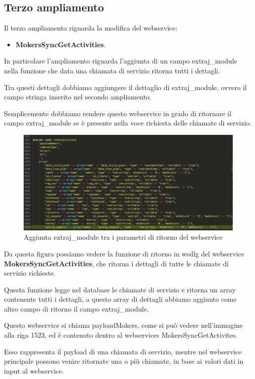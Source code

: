 \subsection{Terzo ampliamento}
Il terzo ampliamento riguarda la modifica del webservice:
\begin{itemize}
	\item \textbf{MokersSyncGetActivities}.
\end{itemize}
\begin{flushleft}
	
	In particolare l'ampliamento riguarda l'aggiunta di un campo extraj\_module nella funzione che data una chiamata di servizio ritorna tutti i dettagli.
	
	Tra questi dettagli dobbiamo aggiungere il dettaglio di extraj\_module, ovvero il campo stringa inserito nel secondo ampliamento.
	
	Semplicemente dobbiamo rendere questo webservice in grado di ritornare il campo extraj\_module se è presente nella voce richiesta delle chiamate di servizio.
	
\end{flushleft}
\newspace
\begin{figure}[!h] 
	\centering
	\includegraphics[scale = 0.3]{immagini/webservices/ampliamenti/3ampl__types_getCisa.png}
	\caption{Aggiunta extraj\_module tra i parametri di ritorno del webservice}
\end{figure}
\newspace
\begin{flushleft}
	Da questa figura possiamo vedere la funzione di ritorno in \gls{wsdlg} del webservice \textbf{MokersSyncGetActivities}, che ritorna i dettagli di tutte le chiamate di servizio richieste. 
	\newspace
	
	Questa funzione legge nel database le chiamate di servizio e ritorna un array contenente tutti i dettagli, a questo array di dettagli abbiamo aggiunto come altro campo di ritorno il campo extraj\_module.
	
	\newspace
	
	Questo webservice si chiama payloadMokers, come si può vedere nell'immagine alla riga 1523, ed è contenuto dentro al webservices MokersSyncGetActivites.
	\newspace
	
	Esso rappresenta il payload di una chiamata di servizio, mentre nel webservice principale possono venire ritornate una o più chiamate, in base ai valori dati in input al webservice.
\end{flushleft}

